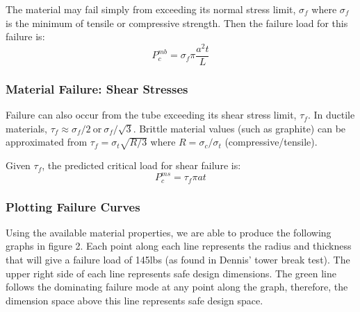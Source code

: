 \documentclass{report}
\begin{document}
The material may fail simply from exceeding its normal stress limit, $\sigma_{f}$ where $\sigma_{f}$ is the minimum of tensile or compressive strength. Then the failure load for this failure is:
$$
P_{c}^{mb} = \sigma_{f} \pi \frac{a^2t}{L}
$$
\subsubsection{Material Failure: Shear Stresses}

Failure can also occur from the tube exceeding its shear stress limit, $\tau_{f}$. In ductile materials, $\tau_{f} \approx \sigma_{f}/2 \ \text{or} \ \sigma_{f}/\sqrt{3}$. Brittle material values (such as graphite) can be approximated from $\tau_{f} = \sigma_{t}\sqrt{R/3} $ where $R = \sigma_{c}/\sigma_{t}$ (compressive/tensile).

Given $\tau_{f}$, the predicted critical load for shear failure is:
$$
P_{c}^{ms} = \tau_{f}\pi at
$$

\subsubsection{Plotting Failure Curves}

Using the available material properties, we are able to produce the following graphs in figure 2. Each point along each line represents the radius and thickness that will give a failure load of 145lbs (as found in Dennis' tower break test). The upper right side of each line represents safe design dimensions. The green line follows the dominating failure mode at any point along the graph, therefore, the dimension space above this line represents safe design space.

\end{document}
